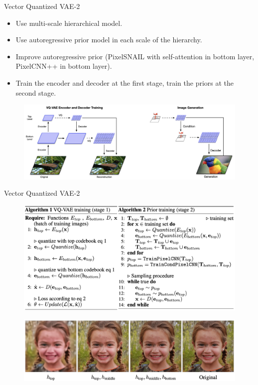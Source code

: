 \documentclass{beamer}
\begin{document}
\begin{frame}{Vector Quantized VAE-2}
	\begin{itemize}
		\item Use multi-scale hierarchical model.
		\item Use autoregressive prior model in each scale of the hierarchy.
		\item Improve autoregressive prior (PixelSNAIL with self-attention in bottom layer, PixelCNN++ in bottom layer).
		\item Train the encoder and decoder at the first stage, train the priors at the second stage.
	\end{itemize}
	\begin{figure}
		\centering
		\includegraphics[width=\linewidth]{figs/vqvae2}
	\end{figure}
\end{frame}
\begin{frame}{Vector Quantized VAE-2}
		\begin{figure}
			\centering
			\includegraphics[width=0.9\linewidth]{figs/vqvae2_pseudo}
		\end{figure}
		\vspace{-0.2cm}
		\begin{figure}
			\centering
			\includegraphics[width=0.85\linewidth]{figs/vqvae2_latents}
		\end{figure}
\end{frame}
\end{document}
